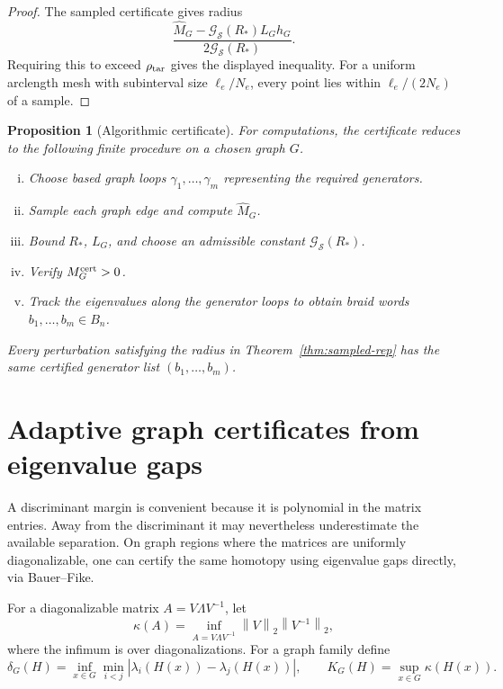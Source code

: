 \documentclass[11pt]{article}
\newtheorem{proposition}[theorem]{Proposition}
\numberwithin{equation}{section}
\newcommand{\cG}{\mathcal G}
\newcommand{\cS}{\mathcal S}
\newcommand{\norm}[1]{\left\|#1\right\|}
\begin{document}
\begin{proof}
The sampled certificate gives radius
\[
  \frac{\widehat M_G-\mathcal G_{\mathcal S}(R_*)L_Gh_G}
       {2\mathcal G_{\mathcal S}(R_*)}.
\]
Requiring this to exceed \(\rho_{\rm tar}\) gives the displayed inequality.
For a uniform arclength mesh with subinterval size \(\ell_e/N_e\), every
point lies within \(\ell_e/(2N_e)\) of a sample.
\end{proof}

\begin{proposition}[Algorithmic certificate]
For computations, the certificate reduces to the following finite procedure on
a chosen graph $G$.
\begin{enumerate}[(i)]
\item Choose based graph loops $\gamma_1,\ldots,\gamma_m$ representing the
required generators.
\item Sample each graph edge and compute $\widehat M_G$.
\item Bound $R_*$, $L_G$, and choose an admissible constant
$\cG_{\cS}(R_*)$.
\item Verify $M_G^{\rm cert}>0$.
\item Track the eigenvalues along the generator loops to obtain braid words
$b_1,\ldots,b_m\in B_n$.
\end{enumerate}
Every perturbation satisfying the radius in Theorem~\ref{thm:sampled-rep}
has the same certified generator list \((b_1,\ldots,b_m)\).
\end{proposition}


\section{Adaptive graph certificates from eigenvalue gaps}\label{sec:adaptive}

A discriminant margin is convenient because it is polynomial in the matrix
entries.  Away from the discriminant it may nevertheless underestimate the available
separation.  On graph regions where the matrices are uniformly diagonalizable,
one can certify the same homotopy using eigenvalue gaps directly, via
Bauer--Fike.

For a diagonalizable matrix \(A=V\Lambda V^{-1}\), let
\[
  \kappa(A)=\inf_{A=V\Lambda V^{-1}}\norm{V}_2\norm{V^{-1}}_2,
\]
where the infimum is over diagonalizations.  For a graph family define
\[
  \delta_G(H)=\inf_{x\in G}\min_{i<j}|\lambda_i(H(x))-\lambda_j(H(x))|,
  \qquad
  K_G(H)=\sup_{x\in G}\kappa(H(x)).
\]
\end{document}

